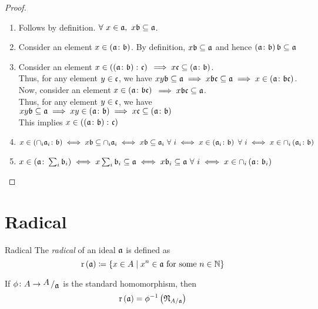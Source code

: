 \begin{proof}
	\
	\begin{enumerate}
		\item Follows by definition.
		\( \forall\ x \in \mathfrak{a}, \ x \mathfrak{b} \subseteq \mathfrak{a} \).
		\item Consider an element \( x \in \left( \mathfrak{a} \colon \mathfrak{b} \right) \).
		By definition, \( x \mathfrak{b} \subseteq \mathfrak{a} \) and hence
		\( \left( \mathfrak{a} \colon \mathfrak{b} \right) \mathfrak{b} \subseteq \mathfrak{a} \)

		\item Consider an element
		\( x \in \left( \left( \mathfrak{a} \colon \mathfrak{b} \right) \colon \mathfrak{c} \right) \)
		\( \implies x \mathfrak{c} \subseteq \left( \mathfrak{a} \colon \mathfrak{b} \right) \). \\
		Thus, for any element \( y \in \mathfrak{c} \), we have
		\( xy\mathfrak{b} \subseteq \mathfrak{a} \implies x \mathfrak{b} \mathfrak{c} \subseteq \mathfrak{a}
		\implies x \in \left( \mathfrak{a} \colon \mathfrak{b} \mathfrak{c} \right) \). \\

		Now, consider an element \( x \in \left( \mathfrak{a} \colon \mathfrak{b} \mathfrak{c} \right) \)
		\( \implies x \mathfrak{b} \mathfrak{c} \subseteq \mathfrak{a} \). \\
		Thus, for any element \( y \in \mathfrak{c} \), we have
		\( xy \mathfrak{b} \subseteq \mathfrak{a} \implies xy \in \left( \mathfrak{a} \colon \mathfrak{b} \right)
		\implies x \mathfrak{c} \subseteq \left( \mathfrak{a} \colon \mathfrak{b} \right) \) \\
		This implies \( x \in \left( \left( \mathfrak{a} \colon \mathfrak{b} \right) \colon \mathfrak{c} \right) \)

		\item \( x \in \left( \cap_i \mathfrak{a}_i \colon \mathfrak{b} \right)
		\iff x \mathfrak{b} \subseteq \cap_i \mathfrak{a}_i \iff x \mathfrak{b} \subseteq \mathfrak{a}_i
		\ \forall\ i \iff x \in \left( \mathfrak{a}_i \colon \mathfrak{b} \right) \ \forall\ i
		\iff x \in \cap_i \left( \mathfrak{a}_i \colon \mathfrak{b} \right) \)

		\item \( x \in \left( \mathfrak{a} \colon \sum_i \mathfrak{b}_i \right) \iff
		x \sum_i \mathfrak{b}_i \subseteq \mathfrak{a} \iff x \mathfrak{b}_i \subseteq \mathfrak{a}
		\ \forall\ i \iff x \in \cap_i \left( \mathfrak{a} \colon \mathfrak{b}_i \right) \)
	\end{enumerate}
\end{proof}


\section{Radical}
\begin{defn}{Radical}{}
	The \emph{radical} of an ideal \( \mathfrak{a} \) is defined as
	\[
		\rad \brak{\mfa} \coloneqq
		\fbrak{x \in A \mid x^n \in \mfa \text{ for some } n \in \NN}
	\]
\end{defn}
If \( \phi \colon A \to \bigslant{A}{\mfa} \) is the standard homomorphism,
then
\[
	\operatorname{r} \left( \mathfrak{a} \right) = \phi^{-1} \left( \mathfrak{N}_{A / \mathfrak{a}} \right)
\]

